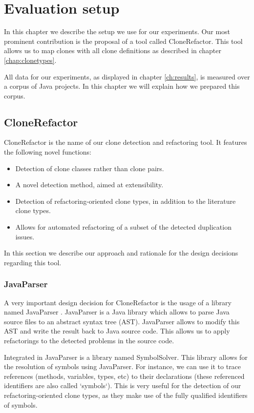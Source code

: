 \chapter{Evaluation setup}
In this chapter we describe the setup we use for our experiments. Our most prominent contribution is the proposal of a tool called CloneRefactor. This tool allows us to map clones with all clone definitions as described in chapter \ref{chap:clonetypes}.

All data for our experiments, as displayed in chapter \ref{ch:results}, is measured over a corpus of Java projects. In this chapter we will explain how we prepared this corpus.

\section{CloneRefactor}
CloneRefactor is the name of our clone detection and refactoring tool. It features the following novel functions:
\begin{itemize}
  \item Detection of clone classes rather than clone pairs.
  \item A novel detection method, aimed at extensibility.
  \item Detection of refactoring-oriented clone types, in addition to the literature clone types.
  \item Allows for automated refactoring of a subset of the detected duplication issues.
\end{itemize}
In this section we describe our approach and rationale for the design decisions regarding this tool.

\subsection{JavaParser}
A very important design decision for CloneRefactor is the usage of a library named JavaParser \cite{tomassetti2017javaparser}. JavaParser is a Java library which allows to parse Java source files to an abstract syntax tree (AST). JavaParser allows to modify this AST and write the result back to Java source code. This allows us to apply refactorings to the detected problems in the source code.

Integrated in JavaParser is a library named SymbolSolver. This library allows for the resolution of symbols using JavaParser. For instance, we can use it to trace references (methods, variables, types, etc) to their declarations (these referenced identifiers are also called `symbols`). This is very useful for the detection of our refactoring-oriented clone types, as they make use of the fully qualified identifiers of symbols.

